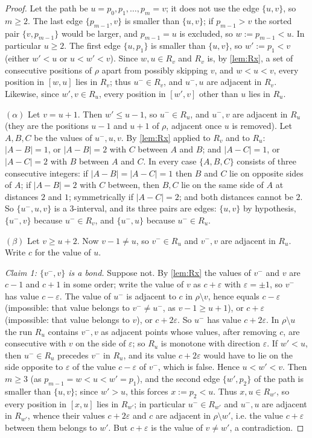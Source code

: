 \documentclass[11pt,reqno]{amsart}
\theoremstyle{plain}
\theoremstyle{definition}
\theoremstyle{remark}
\begin{document}
\begin{proof}
Let the path be $u=p_0,p_1,\dots,p_m=v$; it does not use the edge $\{u,v\}$, so $m\ge2$. The last edge $\{p_{m-1},v\}$ is smaller than $\{u,v\}$; if $p_{m-1}>v$ the sorted pair $\{v,p_{m-1}\}$ would be larger, and $p_{m-1}=u$ is excluded, so $w:=p_{m-1}<u$. In particular $u\ge2$. The first edge $\{u,p_1\}$ is smaller than $\{u,v\}$, so $w':=p_1<v$ (either $w'<u$ or $u<w'<v$). Since $w,u\in R_v$ and $R_v$ is, by \cref{lem:Rx}, a set of consecutive positions of $\rho$ apart from possibly skipping $v$, and $w<u<v$, every position in $[w,u]$ lies in $R_v$; thus $u^-\in R_v$, and $u^-,u$ are adjacent in $R_v$. Likewise, since $w',v\in R_u$, every position in $[w',v]$ other than $u$ lies in $R_u$.

$(\alpha)$ Let $v=u+1$. Then $w'\le u-1$, so $u^-\in R_u$, and $u^-,v$ are adjacent in $R_u$ (they are the positions $u-1$ and $u+1$ of $\rho$, adjacent once $u$ is removed). Let $A,B,C$ be the values of $u^-,u,v$. By \cref{lem:Rx} applied to $R_v$ and to $R_u$: $|A-B|=1$, or $|A-B|=2$ with $C$ between $A$ and $B$; and $|A-C|=1$, or $|A-C|=2$ with $B$ between $A$ and $C$. In every case $\{A,B,C\}$ consists of three consecutive integers: if $|A-B|=|A-C|=1$ then $B$ and $C$ lie on opposite sides of $A$; if $|A-B|=2$ with $C$ between, then $B,C$ lie on the same side of $A$ at distances $2$ and $1$; symmetrically if $|A-C|=2$; and both distances cannot be $2$. So $\{u^-,u,v\}$ is a $3$-interval, and its three pairs are edges: $\{u,v\}$ by hypothesis, $\{u^-,v\}$ because $u^-\in R_v$, and $\{u^-,u\}$ because $u^-\in R_u$.

$(\beta)$ Let $v\ge u+2$. Now $v-1\ne u$, so $v^-\in R_u$ and $v^-,v$ are adjacent in $R_u$. Write $c$ for the value of $u$.

\emph{Claim 1: $\{v^-,v\}$ is a bond.} Suppose not. By \cref{lem:Rx} the values of $v^-$ and $v$ are $c-1$ and $c+1$ in some order; write the value of $v$ as $c+\varepsilon$ with $\varepsilon=\pm1$, so $v^-$ has value $c-\varepsilon$. The value of $u^-$ is adjacent to $c$ in $\rho\setminus v$, hence equals $c-\varepsilon$ (impossible: that value belongs to $v^-\ne u^-$, as $v-1\ge u+1$), or $c+\varepsilon$ (impossible: that value belongs to $v$), or $c+2\varepsilon$. So $u^-$ has value $c+2\varepsilon$. In $\rho\setminus u$ the run $R_u$ contains $v^-,v$ as adjacent points whose values, after removing $c$, are consecutive with $v$ on the side of $\varepsilon$; so $R_u$ is monotone with direction $\varepsilon$. If $w'<u$, then $u^-\in R_u$ precedes $v^-$ in $R_u$, and its value $c+2\varepsilon$ would have to lie on the side opposite to $\varepsilon$ of the value $c-\varepsilon$ of $v^-$, which is false. Hence $u<w'<v$. Then $m\ge3$ (as $p_{m-1}=w<u<w'=p_1$), and the second edge $\{w',p_2\}$ of the path is smaller than $\{u,v\}$; since $w'>u$, this forces $x:=p_2<u$. Thus $x,u\in R_{w'}$, so every position in $[x,u]$ lies in $R_{w'}$; in particular $u^-\in R_{w'}$ and $u^-,u$ are adjacent in $R_{w'}$, whence their values $c+2\varepsilon$ and $c$ are adjacent in $\rho\setminus w'$, i.e. the value $c+\varepsilon$ between them belongs to $w'$. But $c+\varepsilon$ is the value of $v\ne w'$, a contradiction.


\end{proof}
\end{document}
